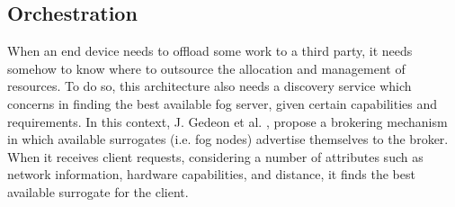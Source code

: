 \subsection{Orchestration}\label{sec:fog_arch_orchestration}
When an end device needs to offload some work to a third party, it needs somehow to know where to outsource the allocation and management of resources. To do so, this architecture also needs a discovery service which concerns in finding the best available fog server, given certain capabilities and requirements. In this context, J. Gedeon et al. \cite{gedeon2017router}, propose a brokering mechanism in which available surrogates (i.e. fog nodes) advertise themselves to the broker. When it receives client requests, considering a number of attributes such as network information, hardware capabilities, and distance, it finds the best available surrogate for the client.\\
